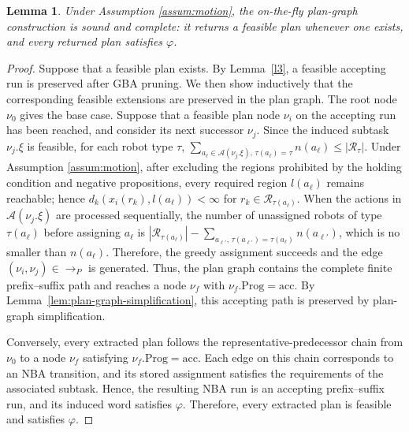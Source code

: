 \documentclass[lettersize,journal]{IEEEtran}
\theoremstyle{italiclemma}
\newtheorem{lemma}{Lemma}
\theoremstyle{italiclemma}
\theoremstyle{definition}
\begin{document}
\begin{lemma}\label{lem:initial-completeness}
Under Assumption \ref{assum:motion}, the on-the-fly plan-graph construction is sound and complete: it returns a feasible plan whenever one exists, and every returned plan satisfies $\varphi$.
\end{lemma}
\begin{proof}
Suppose that a feasible plan exists. By Lemma~\ref{l3}, a feasible accepting run is preserved after GBA pruning. We then show inductively that the corresponding feasible extensions are
preserved in the plan graph. The root node $\nu_0$ gives the base
case. Suppose that a feasible plan node $\nu_i$ on the accepting run
has been reached, and consider its next successor $\nu_j$. Since the
induced subtask $\nu_j.\xi$ is feasible, for each robot type $\tau$,
$\sum_{a_\ell\in\mathcal A(\nu_j.\xi),\,\tau(a_\ell)=\tau}
n(a_\ell)\leq |\mathcal R_\tau|$. Under Assumption \ref{assum:motion}, after excluding the regions prohibited by the holding condition and negative propositions, every required region $l(a_\ell)$ remains reachable; hence $d_k(x_i(r_k),l(a_\ell))<\infty$ for $r_k\in\mathcal R_{\tau(a_\ell)}$. When the actions in $\mathcal A(\nu_j.\xi)$ are processed sequentially, the number of unassigned robots of type $\tau(a_\ell)$ before assigning $a_\ell$ is $|\mathcal R_{\tau(a_\ell)}|-\sum_{a_{\ell'},\,\tau(a_{\ell'})=\tau(a_\ell)}n(a_{\ell'})$, which is no smaller than $n(a_\ell)$. Therefore, the greedy assignment succeeds and the edge $(\nu_i,\nu_j)\in\rightarrow_P$ is generated. Thus, the plan graph contains the complete finite prefix--suffix path and reaches a node $\nu_f$ with $\nu_f.\mathrm{Prog}=\mathrm{acc}$. By Lemma~\ref{lem:plan-graph-simplification}, this accepting path is preserved by plan-graph simplification.

Conversely, every extracted plan follows the representative-predecessor chain from $\nu_0$ to a node $\nu_f$ satisfying $\nu_f.\mathrm{Prog}=\mathrm{acc}$. Each edge on this chain corresponds to an NBA transition, and its stored assignment satisfies the requirements of the associated subtask. Hence, the resulting NBA run is an accepting prefix--suffix run, and its induced word satisfies $\varphi$. Therefore, every extracted plan is feasible and satisfies $\varphi$.

\end{proof}
\end{document}
